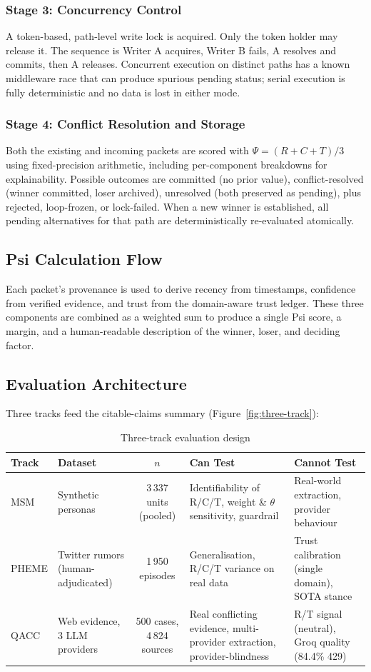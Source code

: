 \documentclass[12pt,a4paper]{article}
\begin{document}
\subsubsection{Stage 3: Concurrency Control}
A token-based, path-level write lock is acquired. Only the token holder may release it. The sequence is Writer A acquires, Writer B fails, A resolves and commits, then A releases. Concurrent execution on distinct paths has a known middleware race that can produce spurious pending status; serial execution is fully deterministic and no data is lost in either mode.

\subsubsection{Stage 4: Conflict Resolution and Storage}
Both the existing and incoming packets are scored with $\Psi=(R+C+T)/3$ using fixed-precision arithmetic, including per-component breakdowns for explainability. Possible outcomes are committed (no prior value), conflict-resolved (winner committed, loser archived), unresolved (both preserved as pending), plus rejected, loop-frozen, or lock-failed. When a new winner is established, all pending alternatives for that path are deterministically re-evaluated atomically.

\subsection{Psi Calculation Flow}
Each packet's provenance is used to derive recency from timestamps, confidence from verified evidence, and trust from the domain-aware trust ledger. These three components are combined as a weighted sum to produce a single Psi score, a margin, and a human-readable description of the winner, loser, and deciding factor.

\subsection{Evaluation Architecture}
Three tracks feed the citable-claims summary (Figure~\ref{fig:three-track}):

\begin{table}[H]
\centering\small
\caption{Three-track evaluation design}
\label{tab:tracks}
\begin{tabular}{lp{3.2cm}cp{3cm}p{4cm}}
\toprule
Track & Dataset & $n$ & Can Test & Cannot Test \\
\midrule
MSM & Synthetic personas & 3\,337 units (pooled) & Identifiability of R/C/T, weight \& $\theta$ sensitivity, guardrail & Real-world extraction, provider behaviour \\
PHEME & Twitter rumors (human-adjudicated) & 1\,950 episodes & Generalisation, R/C/T variance on real data & Trust calibration (single domain), SOTA stance \\
QACC & Web evidence, 3 LLM providers & 500 cases, 4\,824 sources & Real conflicting evidence, multi-provider extraction, provider-blindness & R/T signal (neutral), Groq quality (84.4\% 429) \\
\bottomrule
\end{tabular}
\end{table}
\end{document}
